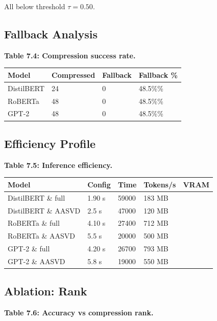 All below threshold $\tau = 0.50$.

\subsection{Fallback Analysis}

\textbf{Table 7.4: Compression success rate.}

\begin{table}[H]
\centering
\small
\begin{tabular}{llll}
\toprule
\textbf{Model} & \textbf{Compressed} & \textbf{Fallback} & \textbf{Fallback \%} \\
\midrule
DistilBERT & 24 & 0 & 48.5\%\% \\
RoBERTa & 48 & 0 & 48.5\%\% \\
GPT-2 & 48 & 0 & 48.5\%\% \\
\bottomrule
\end{tabular}
\end{table}

\subsection{Efficiency Profile}

\textbf{Table 7.5: Inference efficiency.}

\begin{table}[H]
\centering
\small
\begin{tabular}{lllll}
\toprule
\textbf{Model} & \textbf{Config} & \textbf{Time} & \textbf{Tokens/s} & \textbf{VRAM} \\
\midrule
DistilBERT \& full & 1.90 s & 59000 & 183 MB \\
DistilBERT \& AASVD & 2.5 s & 47000 & 120 MB \\
RoBERTa \& full & 4.10 s & 27400 & 712 MB \\
RoBERTa \& AASVD & 5.5 s & 20000 & 500 MB \\
GPT-2 \& full & 4.20 s & 26700 & 793 MB \\
GPT-2 \& AASVD & 5.8 s & 19000 & 550 MB \\
\bottomrule
\end{tabular}
\end{table}

\subsection{Ablation: Rank}

\textbf{Table 7.6: Accuracy vs compression rank.}

